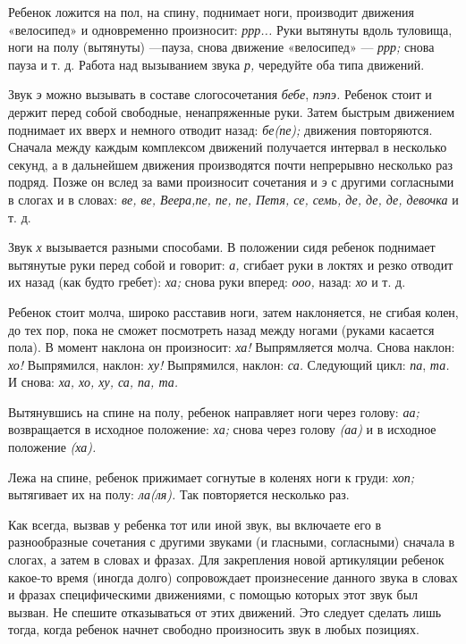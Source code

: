 \documentclass{book}
\renewcommand{\emph}[1]{\textit{#1}}
\begin{document}
Ребенок ложится на пол, на спину, поднимает ноги, производит движения
«велосипед» и одновременно произносит: \emph{ррр...} Руки вытянуты вдоль
туловища, ноги на полу (вытянуты) ---пауза, снова движение «велосипед»
--- \emph{ррр;} снова пауза и т. д. Работа над вызыванием звука
\emph{р,} чередуйте оба типа движений.

Звук \emph{э} можно вызывать в составе слогосочетания \emph{бебе},
\emph{пэпэ.} Ребенок стоит и держит перед собой свободные, ненапряженные
руки. Затем быстрым движением поднимает их вверх и немного отводит
назад: \emph{бе(пе);} движения повторяются. Сначала между каждым
комплексом движений получается интервал в несколько секунд, а в
дальнейшем движения производятся почти непрерывно несколько раз подряд.
Позже он вслед за вами произносит сочетания и \emph{э} с другими
согласными в слогах и в словах: \emph{ве, ве, Веера,пе, пе, пе, Петя,
се, семь, де, де, де, девочка} и т. д.

Звук \emph{х} вызывается разными способами. В положении сидя ребенок
поднимает вытянутые руки перед собой и говорит: \emph{а,} сгибает руки в
локтях и резко отводит их назад (как будто гребет): \emph{ха;} снова
руки вперед: \emph{ооо,} назад: \emph{хо} и т. д.

Ребенок стоит молча, широко расставив ноги, затем наклоняется, не сгибая
колен, до тех пор, пока не сможет посмотреть назад между ногами (руками
касается пола). В момент наклона он произносит: \emph{ха!} Выпрямляется
молча. Снова наклон: \emph{хо!} Выпрямился, наклон: \emph{ху!}
Выпрямился, наклон: \emph{са.} Следующий цикл: \emph{па}, \emph{та.} И
снова: \emph{ха, хо, ху, са, па, та.}

Вытянувшись на спине на полу, ребенок направляет ноги через голову:
\emph{аа;} возвращается в исходное положение: \emph{ха;} снова через
голову \emph{(аа)} и в исходное положение \emph{(ха).}

Лежа на спине, ребенок прижимает согнутые в коленях ноги к груди:
\emph{хоп;} вытягивает их на полу: \emph{ла(ля).} Так повторяется
несколько раз.

Как всегда, вызвав у ребенка тот или иной звук, вы включаете его в
разнообразные сочетания с другими звуками (и гласными, согласными)
сначала в слогах, а затем в словах и фразах. Для закрепления новой
артикуляции ребенок какое-то время (иногда долго) сопровождает
произнесение данного звука в словах и фразах специфическими движениями,
с помощью которых этот звук был вызван. Не спешите отказываться от этих
движений. Это следует сделать лишь тогда, когда ребенок начнет свободно
произносить звук в любых позициях.
\end{document}

